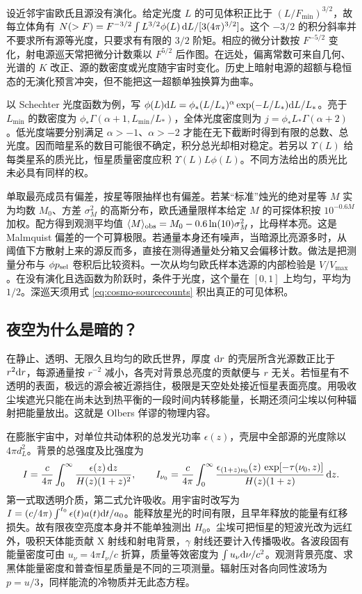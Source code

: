 设近邻宇宙欧氏且源没有演化。给定光度 $L$ 的可见体积正比于 $(L/F_{\min})^{3/2}$，故每立体角有 $N(>F)=F^{-3/2}\int L^{3/2}\phi(L)\,\dd L/[3(4\pi)^{3/2}]$。这个 $-3/2$ 的积分斜率并不要求所有源等光度，只要求有有限的 $3/2$ 阶矩。相应的微分计数按 $F^{-5/2}$ 变化，射电源巡天常把微分计数乘以 $F^{5/2}$ 后作图。在远处，偏离常数可来自几何、光谱的 $K$ 改正、源的数密度或光度随宇宙时变化。历史上暗射电源的超额与稳恒态的无演化预言冲突，但不能把这一超额单独换算为曲率。

以 Schechter 光度函数为例，写 $\phi(L)\dd L=\phi_* (L/L_*)^\alpha\exp(-L/L_*)\dd L/L_*$。亮于 $L_{\min}$ 的数密度为 $\phi_*\Gamma(\alpha+1,L_{\min}/L_*)$，全体光度密度则为 $j=\phi_*L_*\Gamma(\alpha+2)$。低光度端要分别满足 $\alpha>-1$、$\alpha>-2$ 才能在无下截断时得到有限的总数、总光度。因而暗星系的数目可能很不确定，积分总光却相对稳定。若另以 $\Upsilon(L)$ 给每类星系的质光比，恒星质量密度应积 $\Upsilon(L)L\phi(L)$。不同方法给出的质光比未必具有同样的权。

单取最亮成员有偏差，按星等限抽样也有偏差。若某“标准”烛光的绝对星等 $M$ 实为均数 $M_0$、方差 $\sigma_M^2$ 的高斯分布，欧氏通量限样本给定 $M$ 的可探体积按 $10^{-0.6M}$ 加权。配方得到观测平均值 $\langle M\rangle_{\rm obs}=M_0-0.6\ln(10)\sigma_M^2$，比母样本亮。这是 Malmquist 偏差的一个可算极限。若通量本身还有噪声，当暗源比亮源多时，从阈值下方散射上来的源反而多，直接在测得通量处分箱又会偏移计数。做法是把测量分布与 $\phi p_{\rm sel}$ 卷积后比较资料。一次从均匀欧氏样本选源的内部检验是 $V/V_{\max}$。在没有演化且选函数为阶跃时，条件于光度，这个量在 $[0,1]$ 上均匀，平均为 $1/2$。深巡天须用式 \eqref{eq:cosmo-sourcecounts} 积出真正的可见体积。

\subsection{夜空为什么是暗的？}

在静止、透明、无限久且均匀的欧氏世界，厚度 $\dd r$ 的壳层所含光源数正比于 $r^2\dd r$，每源通量按 $r^{-2}$ 减小，各壳对背景总亮度的贡献便与 $r$ 无关。若恒星有不透明的表面，极远的源会被近源挡住，极限是天空处处接近恒星表面亮度。用吸收尘埃遮光只能在尚未达到热平衡的一段时间内转移能量，长期还须问尘埃以何种辐射把能量放出。这就是 Olbers 佯谬的物理内容。

在膨胀宇宙中，对单位共动体积的总发光功率 $\epsilon(z)$，壳层中全部源的光度除以 $4\pi d_L^2$。背景的总强度及比强度为
\begin{equation}\label{eq:cosmo-background-intensity}
 I=\frac{c}{4\pi}\int_0^\infty\frac{\epsilon(z)\,\dd z}{H(z)(1+z)^2},
 \qquad
 I_{\nu_0}=\frac{c}{4\pi}\int_0^\infty
 \frac{\epsilon_{(1+z)\nu_0}(z)\,\exp[-\tau(\nu_0,z)]}{H(z)(1+z)}\,\dd z .
\end{equation}
第一式取透明介质，第二式允许吸收。用宇宙时改写为 $I=(c/4\pi)\int^{t_0}\epsilon(t)a(t)\dd t/a_0$。能释放星光的时间有限，且早年释放的能量有红移损失。故有限夜空亮度本身并不能单独测出 $H_0$。尘埃可把恒星的短波光改为远红外，吸积天体能贡献 X 射线和射电背景，$\gamma$ 射线还要计入传播吸收。各波段固有能量密度可由 $u_\nu=4\pi I_\nu/c$ 折算，质量等效密度为 $\int u_\nu\dd\nu/c^2$。观测背景亮度、求黑体能量密度和普查恒星质量是不同的三项测量。辐射压对各向同性波场为 $p=u/3$，同样能流的冷物质并无此态方程。

